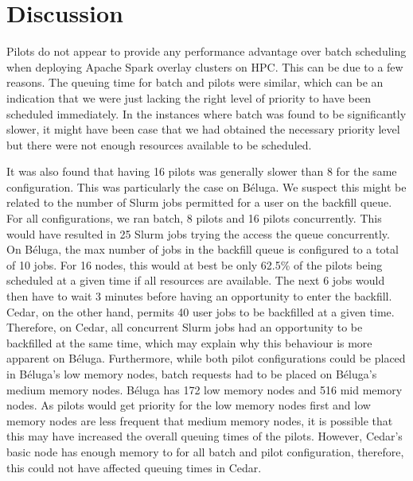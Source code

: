     \section{Discussion}\label{spa:sec:discussion}
    
    
    Pilots do not appear to provide any performance advantage over batch
    scheduling when deploying Apache Spark overlay clusters on HPC.
    This can be due to a few reasons. The queuing time for batch and pilots were similar, 
    which can be an indication that we were just lacking the right level of priority to 
    have been scheduled immediately. In the instances where batch was found to be significantly slower,
    it might have been case that we had obtained the necessary priority level but there
    were not enough resources available to be scheduled.
    
    It was also found that having 16 pilots was generally slower than 8 for the same
    configuration. This was particularly the case on B\'eluga. We suspect this might be
    related to the number of Slurm jobs permitted for a user on the backfill queue. For
    all configurations, we ran batch, 8 pilots and 16 pilots concurrently. This would have
    resulted in 25 Slurm jobs trying the access the queue concurrently. On
    B\'eluga, the max number of jobs in the backfill queue is configured to a
    total of 10 jobs. For 16 nodes, this would at best be only 62.5\% of the
    pilots being scheduled at a given time if all resources are available.
    The next 6 jobs would then have to wait 3 minutes before having an opportunity to enter the
    backfill. Cedar, on the other hand, permits 40 user jobs to be backfilled at a given time.
    Therefore, on Cedar, all concurrent Slurm jobs had an opportunity to be backfilled at
    the same time, which may explain why this behaviour is more apparent on B\'eluga. Furthermore,
    while both pilot configurations could be placed in B\'eluga's low memory nodes, batch requests
    had to be placed on B\'eluga's medium memory nodes. B\'eluga has 172 low memory nodes and
    516 mid memory nodes. As pilots would get priority for the low memory nodes first and 
    low memory nodes are less frequent that medium memory nodes, it is possible that this
    may have increased the overall queuing times of the pilots. However, Cedar's basic
    node has enough memory to for all batch and pilot configuration, therefore, this could not
    have affected queuing times in Cedar.
    
